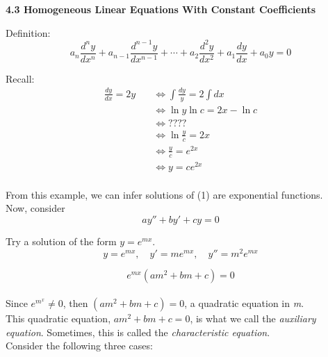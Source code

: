 \documentclass[10pt]{article}
\begin{document}
\textbf{4.3 Homogeneous Linear Equations With Constant Coefficients} \\

\bigskip

Definition: \\
\smallskip
\begin{equation}
a_{n}\frac{d^n y}{dx^n} + a_{n-1}\frac {d^{n-1}y}{dx^{n-1}} + \cdots + a_{2}\frac{d^2y}{dx^2} + a_1\frac{dy}{dx} + a_{0}y = 0
\label{eqn:1}
\end{equation}

\bigskip 

Recall: \\
\begin{align*}
\frac{dy}{dx} = 2y \quad & \Leftrightarrow \int\frac{dy}{y} = 2\int{dx}\\
& \Leftrightarrow \ln{y}\ln{c}  = 2x-\ln{c} \\ 
& \Leftrightarrow ???? \\ 
& \Leftrightarrow \ln{\frac{y}{c}} = 2x \\
& \Leftrightarrow  \frac{y}{c} = e^{2x}\\ 
& \Leftrightarrow y = ce^{2x} \\ 
\end{align*}

From this example, we can infer solutions of (1) are exponential functions. \\

Now, consider \\

\begin{equation}
ay''+by'+cy = 0
\end{equation}
\bigskip

Try a solution of the form \(y = e^{mx}\). \\

\[y=e^{mx},\quad y'=me^{mx}, \quad y''=m^2e^{mx}\]

\[e^{mx}(am^2+bm+c) = 0\] \\

Since \(e^{m^x} \ne 0\), then \((am^2 + bm + c) = 0\), a quadratic equation in \textit{m}. \\

This quadratic equation, \(am^2 + bm + c = 0\), is what we call the \textit{auxiliary equation}. Sometimes, this is called the \textit{characteristic equation}. \\

Consider the following three cases: \\
\end{document}
